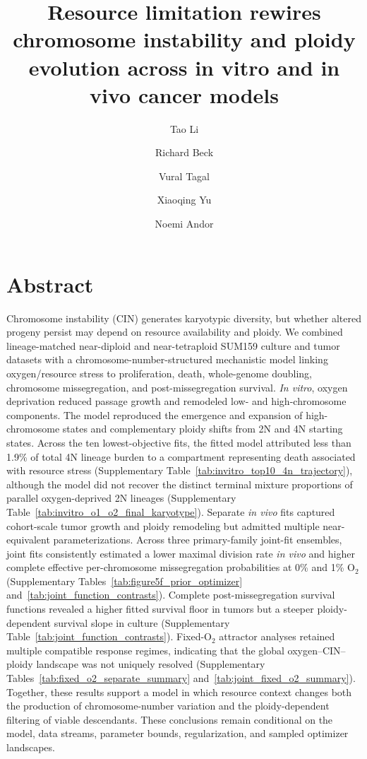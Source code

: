 \documentclass[11pt]{article}
\title{Resource limitation rewires chromosome instability and ploidy evolution across in vitro and in vivo cancer models}
\author[1,$\dagger$]{Tao Li}
\author[1,$\dagger$]{Richard Beck}
\author[1]{Vural Tagal}
\author[2]{Xiaoqing Yu}
\author[1,*]{Noemi Andor}
\affil[1]{H. Lee Moffitt Cancer Center \& Research Institute, Tampa, FL, USA}
\affil[2]{ \footnotesize Department of Biostatistics and Bioinformatics, H Lee Moffitt Cancer Center and Research Institute, Tampa, FL, USA}
\affil[$\dagger$]{These authors contributed equally to this work.}
\date{}
\begin{document}
\maketitle

\section*{Abstract}

Chromosome instability (CIN) generates karyotypic diversity, but whether altered progeny persist may depend on resource availability and ploidy. We combined lineage-matched near-diploid and near-tetraploid SUM159 culture and tumor datasets with a chromosome-number-structured mechanistic model linking oxygen/resource stress to proliferation, death, whole-genome doubling, chromosome missegregation, and post-missegregation survival. \textit{In vitro}, oxygen deprivation reduced passage growth and remodeled low- and high-chromosome components. The model reproduced the emergence and expansion of high-chromosome states and complementary ploidy shifts from 2N and 4N starting states. Across the ten lowest-objective fits, the fitted model attributed less than 1.9\% of total 4N lineage burden to a compartment representing death associated with resource stress (Supplementary Table~\ref{tab:invitro_top10_4n_trajectory}), although the model did not recover the distinct terminal mixture proportions of parallel oxygen-deprived 2N lineages (Supplementary Table~\ref{tab:invitro_o1_o2_final_karyotype}). Separate \textit{in vivo} fits captured cohort-scale tumor growth and ploidy remodeling but admitted multiple near-equivalent parameterizations. Across three primary-family joint-fit ensembles, joint fits consistently estimated a lower maximal division rate \textit{in vivo} and higher complete effective per-chromosome missegregation probabilities at 0\% and 1\% O$_2$ (Supplementary Tables~\ref{tab:figure5f_prior_optimizer} and~\ref{tab:joint_function_contrasts}). Complete post-missegregation survival functions revealed a higher fitted survival floor in tumors but a steeper ploidy-dependent survival slope in culture (Supplementary Table~\ref{tab:joint_function_contrasts}). Fixed-O$_2$ attractor analyses retained multiple compatible response regimes, indicating that the global oxygen--CIN--ploidy landscape was not uniquely resolved (Supplementary Tables~\ref{tab:fixed_o2_separate_summary} and~\ref{tab:joint_fixed_o2_summary}). Together, these results support a model in which resource context changes both the production of chromosome-number variation and the ploidy-dependent filtering of viable descendants. These conclusions remain conditional on the model, data streams, parameter bounds, regularization, and sampled optimizer landscapes.
\end{document}
